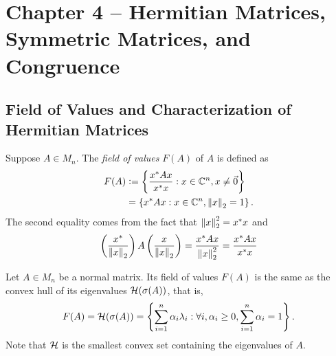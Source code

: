 \section{Chapter 4 -- Hermitian Matrices, Symmetric Matrices, and Congruence}

\subsection{Field of Values and Characterization of Hermitian Matrices}
\begin{definition}
Suppose $A \in M_n$. The \textit{field of values} $F(A)$ of $A$ is defined as
\begin{align*}
    F(A) 
        &\vcentcolon= \left\{\frac{x^*Ax}{x^*x} : x\in \mathbb C^n, x \not= \Vec{0}\right\} \\
        &= \left\{x^*Ax : x \in \mathbb C^n, \left\lVert x\right\rVert_2 = 1 \right\}.
\end{align*}
The second equality comes from the fact that $\left\lVert x\right\rVert_2^2 = x^*x$ and 
$$
\left(\frac{x^*}{\left\lVert x\right\rVert_2}\right)A\left(\frac{x}{\left\lVert x\right\rVert_2}\right) = \frac{x^*Ax}{\left\lVert x\right\rVert_2^2} = \frac{x^*Ax}{x^*x}
$$
\end{definition}

\begin{theorem}
\label{thm:field-of-values-convex-hull}
Let $A \in M_n$ be a normal matrix. Its field of values $F(A)$ is the same as the convex hull of its eigenvalues $\mathcal{H}(\sigma(A))$, that is,
$$
F(A) = \mathcal{H}(\sigma(A)) = \left\{\sum_{i=1}^n \alpha_i \lambda_i : \forall i, \alpha_i \geq 0, \sum_{i=1}^n \alpha_i = 1 \right\}.
$$
Note that $\mathcal{H}$ is the smallest convex set containing the eigenvalues of $A$.
\end{theorem}

